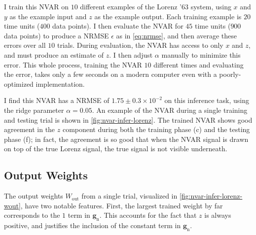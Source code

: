 I train this NVAR on $10$ different examples of the Lorenz '63
system, using $x$ and $y$ as the example input and $z$ as the example
output. Each training example is $20$ time units ($400$ data points). I then evaluate
the NVAR for $45$ time units ($900$ data points) to produce a NRMSE $\epsilon$ as in
\cref{eq:nrmse}, and then average these errors over all $10$
trials. During evaluation, the NVAR has access to only $x$ and $z$,
and must produce an estimate of $z$. I then adjust $\alpha$ manually
to minimize this error. This whole process, training the NVAR $10$
different times and evaluating the error, takes only a few seconds on
a modern computer even with a poorly-optimized implementation.

I find this NVAR has a NRMSE of $1.75\pm0.3\times10^{-2}$ on this
inference task, using the ridge parameter $\alpha = 0.05$. An example
of the NVAR during a single training and testing trial is shown in
\cref{fig:nvar-infer-lorenz}. The trained NVAR shows good agreement in
the $z$ component during both the training phase (c) and the testing
phase (f); in fact, the agreement is so good that when the NVAR signal is
drawn on top of the true Lorenz signal, the true signal is not visible
underneath.

\subsection{Output Weights}\label{sec:nvar-infer-weights}

The output weights $W_\text{out}$ from a single trial, visualized in
\cref{fig:nvar-infer-lorenz-wout}, have two notable features. First,
the largest trained weight by far corresponds to the $1$ term in
$\bm{g}_\text{n}$. This accounts for the fact that $z$ is always
positive, and justifies the inclusion of the constant term in
$\bm{g}_\text{n}$.

